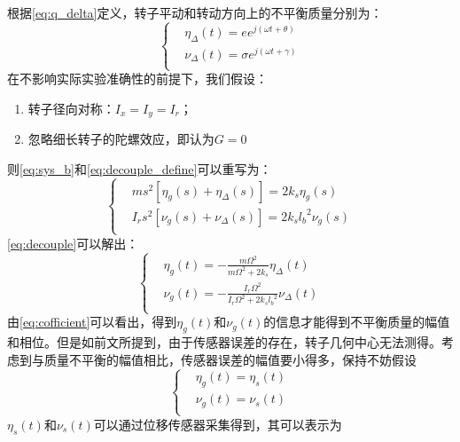 \documentclass[
  lang=cn,
  degree=master,
  openany,oneside
]{nuaathesis}
\begin{document}
根据\autoref{eq:q_delta}定义，转子平动和转动方向上的不平衡质量分别为：
\begin{equation}
\label{eq:eta_nu_define}
\left\{
\begin{aligned}
&\eta _{\Delta}(t) = ee^{j(\omega t + \theta)} \\
&\nu _{\Delta}(t) = \sigma e^{j(\omega t + \gamma)} \\
\end{aligned}
\right.
\end{equation}
在不影响实际实验准确性的前提下，我们假设：
\begin{enumerate}
	\item 转子径向对称：$I_x = I_y = I_r$；
	\item 忽略细长转子的陀螺效应，即认为$G = 0$
\end{enumerate}
则\autoref{eq:sys_b}和\autoref{eq:decouple_define}可以重写为：
\begin{equation}
\label{eq:decouple}
\left\{
\begin{aligned}
& ms^2\left[ \eta _g(s)+\eta_{\Delta}(s) \right] = 2k_s\eta _g(s)\\
& {I_r}s^2\left[ \nu _g(s)+\nu_{\Delta}(s) \right] = 2k_s{l_b}^2\nu _g(s)\\
\end{aligned}
\right.
\end{equation}
\autoref{eq:decouple}可以解出：
\begin{equation}
\label{eq:cofficient}
\left\{
\begin{aligned}
& \eta _g (t) = -\frac{m{\Omega}^2}{m{\Omega}^2+2k_s}\eta _{\Delta}(t)\\
& \nu _g (t) = -\frac{I_r{\Omega}^2}{I_r{\Omega}^2+2k_s{l_b}^2}\nu _{\Delta}(t)\\
\end{aligned}
\right.
\end{equation}
由\autoref{eq:cofficient}可以看出，得到$\eta _g(t)$和$\nu _g(t)$的信息才能得到不平衡质量的幅值和相位。但是如前文所提到，由于传感器误差的存在，转子几何中心无法测得。考虑到与质量不平衡的幅值相比，传感器误差的幅值要小得多，保持不妨假设
\begin{equation}
\label{eq:assumption}
\left\{
\begin{aligned}
& \eta _g (t) = \eta _s (t)\\
& \nu _g (t) = \nu _s (t)  \\
\end{aligned}
\right.
\end{equation}
$\eta _s(t)$和$\nu _s(t)$可以通过位移传感器采集得到，其可以表示为
\end{document}
